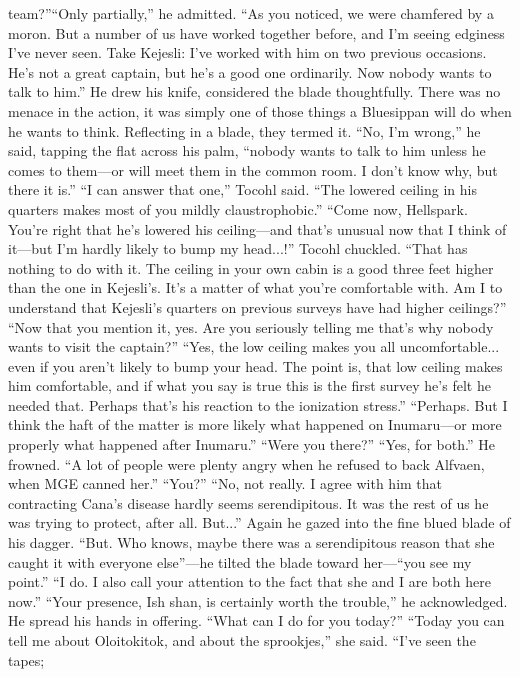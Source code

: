 \documentclass[9pt]{article}
\begin{document}
team?”“Only partially,” he admitted. “As you noticed, we were chamfered by a moron. But a number of us
have worked together before, and I’m seeing edginess I’ve never seen. Take Kejesli: I’ve worked with
him on two previous occasions. He’s not a great captain, but he’s a good one ordinarily. Now nobody
wants to talk to him.”
He drew his knife, considered the blade thoughtfully. There was no menace in the action, it was
simply one of those things a Bluesippan will do when he wants to think. Reflecting in a blade, they termed
it.
“No, I’m wrong,” he said, tapping the flat across his palm, “nobody wants to talk to him unless he
comes to them—or will meet them in the common room. I don’t know why, but there it is.”
“I can answer that one,” Tocohl said. “The lowered ceiling in his quarters makes most of you mildly
claustrophobic.”
“Come now, Hellspark. You’re right that he’s lowered his ceiling—and that’s unusual now that I
think of it—but I’m hardly likely to bump my head...!”
Tocohl chuckled. “That has nothing to do with it. The ceiling in your own cabin is a good three feet
higher than the one in Kejesli’s. It’s a matter of what you’re comfortable with. Am I to understand that
Kejesli’s quarters on previous surveys have had higher ceilings?”
“Now that you mention it, yes. Are you seriously telling me that’s why nobody wants to visit the
captain?”
“Yes, the low ceiling makes you all uncomfortable... even if you aren’t likely to bump your head. The
point is, that low ceiling makes him comfortable, and if what you say is true this is the first survey he’s felt
he needed that. Perhaps that’s his reaction to the ionization stress.”
“Perhaps. But I think the haft of the matter is more likely what happened on Inumaru—or more
properly what happened after Inumaru.”
“Were you there?”
“Yes, for both.” He frowned. “A lot of people were plenty angry when he refused to back Alfvaen,
when MGE canned her.”
“You?”
“No, not really. I agree with him that contracting Cana’s disease hardly seems serendipitous. It was
the rest of us he was trying to protect, after all. But...” Again he gazed into the fine blued blade of his
dagger. “But. Who knows, maybe there was a serendipitous reason that she caught it with everyone
else”—he tilted the blade toward her—“you see my point.”
“I do. I also call your attention to the fact that she and I are both here now.”
“Your presence, Ish shan, is certainly worth the trouble,” he acknowledged. He spread his hands in
offering. “What can I do for you today?”
“Today you can tell me about Oloitokitok, and about the sprookjes,” she said. “I’ve seen the tapes;
\end{document}

